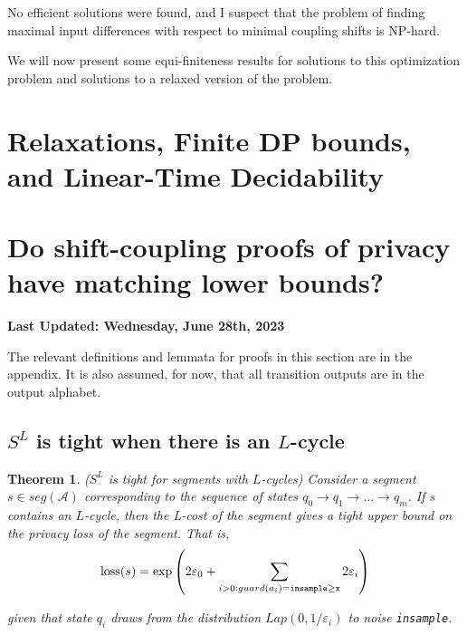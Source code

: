 \documentclass{article}
\newtheorem{theorem}{Theorem}
\renewcommand{\epsilon}{\varepsilon}
\newcommand{\loss}{\textup{loss}}
\newcommand{\insamplegeqx}{\textup{\texttt{insample$\geq$x}}}
\newcommand{\insample}{\textup{\texttt{insample}}}
\newcommand{\1}{\langle 1 \rangle}
\newcommand{\2}{\langle 2 \rangle}
\begin{document}
No efficient solutions were found, and I suspect that the problem of finding maximal input differences with respect to minimal coupling shifts is NP-hard. 

We will now present some equi-finiteness results for solutions to this optimization problem and solutions to a relaxed version of the problem. 

\section{Relaxations, Finite DP bounds, and Linear-Time Decidability}

\section{Do shift-coupling proofs of privacy have matching lower bounds?}
\textbf{Last Updated: Wednesday, June 28th, 2023}

The relevant definitions and lemmata for proofs in this section are in the appendix. It is also assumed, for now, that all transition outputs are in the output alphabet. 

\subsection{$S^L$ is tight when there is an $L$-cycle}

\begin{theorem} ($S^L$ is tight for segments with $L$-cycles)
    Consider a segment $s \in seg(\mathcal{A})$ corresponding to the sequence of states $q_0 \to q_1 \to \dots \to q_m$. If $s$ contains an $L$-cycle, then the L-cost of the segment gives a tight upper bound on the privacy loss of the segment. That is, \[\loss(s) =  \exp\left(2 \epsilon_0 + \sum_{i > 0: guard(a_i) = \insamplegeqx} 2\epsilon_i \right)\]

    given that state $q_i$ draws from the distribution $Lap(0, 1/\epsilon_i)$ to noise \insample.
\end{theorem}
\end{document}
